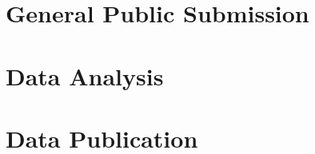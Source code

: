 \section{General Public Submission}
\label{sec:proposal-public-submission}

\section{Data Analysis}
\label{sec:proposal-data-analysis}

\section{Data Publication}
\label{sec:proposal-data-publication}